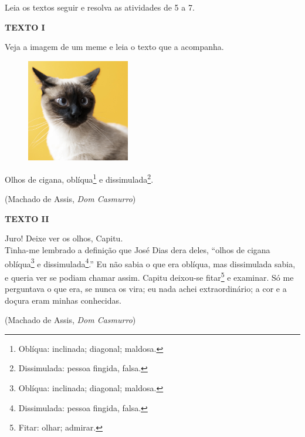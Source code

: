 Leia os textos seguir e resolva as atividades de 5 a 7.

\begin{myquote}
\begin{center}
\textbf{TEXTO I}
\end{center}

\noindent Veja a imagem de um meme e leia o texto que a acompanha.

\begin{figure}[H]
\centering\includegraphics[width=0.4\textwidth]{./imgSAEB_6_POR/freepik/PORT_6_IMG-16.jpeg}
\end{figure}

Olhos de cigana, oblíqua\footnote{Oblíqua: inclinada; diagonal; maldosa.} e dissimulada\footnote{Dissimulada: pessoa fingida, falsa.}.

\medskip

\begin{flushright}
(Machado de Assis, \emph{Dom Casmurro})
\end{flushright}
\end{myquote}

\begin{myquote}
\begin{center}
\textbf{TEXTO II}
\end{center}

\noindent Juro! Deixe ver os olhos, Capitu.\\
Tinha-me lembrado a definição que José Dias dera deles, ``olhos de cigana
oblíqua\footnote{Oblíqua: inclinada; diagonal; maldosa.} e dissimulada\footnote{Dissimulada: pessoa fingida, falsa.}.'' Eu não sabia o que era oblíqua, mas dissimulada
sabia, e queria ver se podiam chamar assim. Capitu deixou-se fitar\footnote{Fitar: olhar; admirar.} e
examinar. Só me perguntava o que era, se nunca os vira; eu nada achei
extraordinário; a cor e a doçura eram minhas conhecidas.
\medskip

\begin{flushright}
(Machado de Assis, \emph{Dom Casmurro})
\end{flushright}

\end{myquote}




